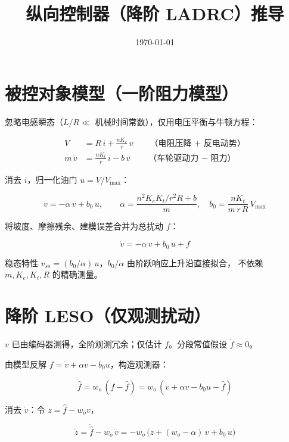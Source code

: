 \documentclass[11pt,a4paper]{article}
\title{纵向控制器（降阶 LADRC）推导}
\author{}
\date{\today}
\begin{document}
\maketitle

\section{被控对象模型（一阶阻力模型）}

忽略电感瞬态（$L/R \ll$ 机械时间常数），仅用电压平衡与牛顿方程：

\begin{align}
V &= R\,i + \frac{nK_e}{r}\,v \qquad \text{（电阻压降 + 反电动势）} \\
m\,\dot v &= \frac{nK_t}{r}\,i - b\,v \qquad \text{（车轮驱动力 $-$ 阻力）}
\end{align}

消去 $i$，归一化油门 $u = V/V_{\max}$：

\begin{equation}
\dot v = -\alpha\,v + b_0\,u,
\qquad
\alpha = \frac{n^2K_eK_t/r^2R + b}{m},
\quad
b_0 = \frac{nK_t}{m\,r\,R}\,V_{\max}
\end{equation}

将坡度、摩擦残余、建模误差合并为总扰动 $f$：

\begin{equation}
\boxed{\dot v = -\alpha\,v + b_0\,u + f}
\end{equation}

稳态特性 $v_{ss} = (b_0/\alpha)\,u$，$b_0/\alpha$ 由阶跃响应上升沿直接拟合，
不依赖 $m,K_e,K_t,R$ 的精确测量。

\section{降阶 LESO（仅观测扰动）}

$v$ 已由编码器测得，全阶观测冗余；仅估计 $f$。分段常值假设 $\dot f \approx 0$。

由模型反解 $f = \dot v + \alpha v - b_0 u$，构造观测器：

\begin{equation}
\dot{\hat f} = w_o\,(f - \hat f) = w_o\,(\dot v + \alpha v - b_0 u - \hat f)
\end{equation}

消去 $\dot v$：令 $z = \hat f - w_o v$，

\begin{equation}
\dot z = \dot{\hat f} - w_o\,\dot v = -w_o\,\big(z + (w_o-\alpha)\,v + b_0\,u\big)
\end{equation}
\end{document}
